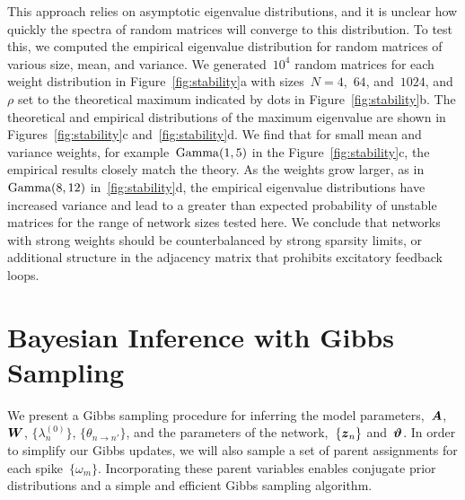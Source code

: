  
This approach relies on asymptotic eigenvalue distributions, and it is
unclear how quickly the spectra of random matrices will converge to
this distribution. To test this, we computed the empirical eigenvalue
distribution for random matrices of various size, mean, and
variance. We generated~$10^4$ random matrices for each weight
distribution in Figure~\ref{fig:stability}a with sizes~$N=4$,~$64$,
and~$1024$, and~$\rho$ set to the theoretical maximum indicated by
dots in Figure~\ref{fig:stability}b. The theoretical and
empirical distributions of the maximum eigenvalue are shown in
Figures~\ref{fig:stability}c and~\ref{fig:stability}d. We find
that for small mean and variance weights, for
example~$\mathrm{Gamma}(1,5)$ in the Figure~\ref{fig:stability}c, the
empirical results closely match the theory. As the weights grow
larger, as in~${\mathrm{Gamma}(8,12)}$ in~\ref{fig:stability}d, the
empirical eigenvalue distributions have increased variance and lead to
a greater than expected probability of unstable matrices for the range
of network sizes tested here. We conclude that networks with strong
weights should be counterbalanced by strong sparsity limits, or
additional structure in the adjacency matrix that prohibits excitatory
feedback loops.


\section{Bayesian Inference with Gibbs Sampling}
\label{sec:hawkes_inference}
We present a Gibbs sampling procedure for inferring the model
parameters,~$\boldsymbol{A}$,~$\boldsymbol{W}$, $\{\lambda^{(0)}_{n}\}$, $\{\theta_{n \to n'}\}$,
and the parameters of the network,~$\{\boldsymbol{z}_n\}$ and~$\boldsymbol{\vartheta}$.
In order to simplify our Gibbs updates, we
will also sample a set of parent assignments for each
spike~$\{\omega_m\}$. Incorporating these parent variables enables
conjugate prior distributions and a simple and efficient Gibbs sampling
algorithm.

